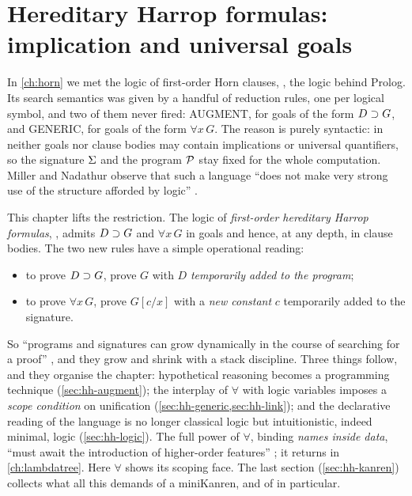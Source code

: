 \chapter[Hereditary Harrop formulas: implication and universal goals]{Hereditary Harrop formulas:\\ implication and universal goals}\label{ch:hh}

\newcommand{\hhfoc}[4]{#1;#2\xrightarrow{\,#3\,}#4}

In \cref{ch:horn} we met the logic of first-order Horn clauses, \fohc, the logic behind Prolog.
Its search semantics was given by a handful of reduction rules, one per logical symbol, and two
of them never fired: AUGMENT, for goals of the form $D\supset G$, and GENERIC, for goals of the form
$\forall x\,G$. The reason is purely syntactic: in \fohc{} neither goals nor clause bodies may
contain implications or universal quantifiers, so the signature $\Sigma$ and the program $\mathcal{P}$ stay
fixed for the whole computation. Miller and Nadathur \cite{MillerNadathur2012} observe that such a language ``does not make
very strong use of the structure afforded by logic'' .

This chapter lifts the restriction. The logic of \emph{first-order hereditary Harrop formulas},
\fohh, admits $D\supset G$ and $\forall x\,G$ in goals and hence, at any depth, in clause bodies. The
two new rules have a simple operational reading:
\begin{itemize}
  \item to prove $D\supset G$, prove $G$ with $D$ \emph{temporarily added to the program};
  \item to prove $\forall x\,G$, prove $G[c/x]$ with a \emph{new constant} $c$ temporarily added to
        the signature.
\end{itemize}
So ``programs and signatures can grow dynamically in the course of searching for a proof''
, and they grow and shrink with a stack discipline. Three things follow, and they organise
the chapter: hypothetical reasoning becomes a programming technique (\cref{sec:hh-augment}); the
interplay of $\forall$ with logic variables imposes a \emph{scope condition} on unification
(\cref{sec:hh-generic,sec:hh-link}); and the declarative reading of the language is no longer
classical logic but intuitionistic, indeed minimal, logic (\cref{sec:hh-logic}). The full power of
$\forall$, binding \emph{names inside data}, ``must await the introduction of higher-order features''
; it returns in \cref{ch:lambdatree}. Here $\forall$ shows its scoping face. The last section
(\cref{sec:hh-kanren}) collects what all this demands of a miniKanren, and of \micro{} in
particular.


